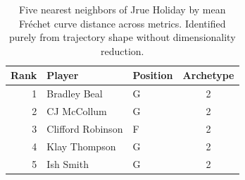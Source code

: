 \begin{table}[htbp]
  \centering\small
  \begin{tabular}{rllc}
    \toprule
    Rank & Player & Position & Archetype \\
    \midrule
    1 & Bradley Beal & G & 2 \\
    2 & CJ McCollum & G & 2 \\
    3 & Clifford Robinson & F & 2 \\
    4 & Klay Thompson & G & 2 \\
    5 & Ish Smith & G & 2 \\
    \bottomrule
  \end{tabular}
  \caption{Five nearest neighbors of Jrue Holiday by mean Fr\'{e}chet curve distance across metrics. Identified purely from trajectory shape without dimensionality reduction.}
  \label{tab:Jrue_Holiday_frechet_curve_neighbors}
\end{table}

